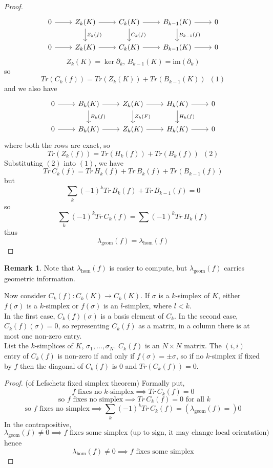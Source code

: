 \documentclass[a4paper,14pt]{extarticle}
\theoremstyle{definition}
\newtheorem*{remark}{Remark}
\begin{document}
\begin{proof}
	\[
	\begin{tikzcd}
		0\arrow{r} & Z_k(K) \arrow{r}
		\arrow{d}{Z_k(f)} & C_k(K) \arrow{r} \arrow{d}{C_k(f)} &
		B_{k-1}(K) \arrow{r}\arrow{d}{B_{k-1}(f)} & 0\\
		0 \arrow{r}& Z_k(K) \arrow{r} & C_k(K) \arrow{r}
		& B_{k-1}(K) \arrow{r} & 0
	\end{tikzcd}
	\]
	\[Z_k(K)=\ker\partial_k,\,B_{k-1}(K)=\text{im}(\partial_k)\]
	so \[Tr(C_k(f)) = Tr(Z_k(K)) + Tr(B_{k-1}(K))\,\,\,(1)\]
	and we also have
	\[
	\begin{tikzcd}
		0\arrow{r} & B_k(K) \arrow{r}
		\arrow{d}{B_k(f)} & Z_k(K) \arrow{r} \arrow{d}{Z_k(F)} &
		H_{k}(K) \arrow{r}\arrow{d}{H_k(f)} & 0\\
		0 \arrow{r}& B_k(K) \arrow{r} & Z_k(K) \arrow{r}
		& H_k(K) \arrow{r} & 0
	\end{tikzcd}
	\]
	where both the rows are exact, so 
	\[Tr(Z_k(f)) = Tr(H_k(f)) + Tr(B_k(f))\,\,\,(2)\]
	Substituting $(2)$ into $(1)$, we have 
	\[Tr \,C_k(f) = Tr \,H_k(f) + Tr \,B_k(f) + Tr (B_{k-1}(f))\] but 
	\[\sum_k (-1)^k Tr \,B_k(f) + Tr \,B_{k-1}(f) = 0\]
	so 
	\[\sum_k (-1)^k Tr \,C_k(f) = \sum (-1)^k Tr \,H_k(f)\] thus 
	\[\lambda_\text{geom}(f)=\lambda_\text{hom}(f)\]
\end{proof}

\begin{remark}
	Note that $\lambda_\text{hom}(f)$ is easier to compute, but $\lambda_\text{geom}(f)$ 
	carries geometric information.
\end{remark}

Now consider $C_k(f):C_k(K)\rightarrow C_k(K)$. If $\sigma$ is a $k$-simplex of $K$, either 
$f(\sigma)$ is a $k$-simplex or $f(\sigma)$ is an $l$-simplex, where $l<k$. \\

In the first case, $C_k(f)(\sigma)$ is a basis element of $C_k$. In the second case, 
$C_k(f)(\sigma)=0$, so representing $C_k(f)$ as a matrix, in a column there is at most 
one non-zero entry. \\

List the $k$-simplices of $K$, $\sigma_1,\ldots,\sigma_N$.
$C_k(f)$ is an $N\times N$ matrix. The $(i,i)$ entry of $C_k(f)$ is non-zero if and 
only if $f(\sigma)=\pm\sigma$, so if no $k$-simplex if fixed by $f$ then the diagonal of 
$C_k(f)$ is $0$ and $Tr(C_k(f))=0$. \\

\begin{proof}(of Lefschetz fixed simplex theorem)
	Formally put, 
\[f\text{ fixes no $k$-simplex}\implies Tr \,C_k(f)=0\]
\[\text{ so $f$ fixes no simplex}\implies Tr \,C_k(f)=0\text{ for all $k$}\]
\[\text{so $f$ fixes no simplex}\implies \sum_k (-1)^k Tr \,C_k(f)=
(\lambda_\text{geom}(f)=)0\]
In the contrapositive,
\[\lambda_\text{geom}(f)\neq0\implies\text{$f$ fixes some simplex (up to sign, it may 
change local orientation)}\] hence 
\[\lambda_\text{hom}(f)\neq0\implies\text{$f$ fixes some simplex}\]
\end{proof}
\end{document}
